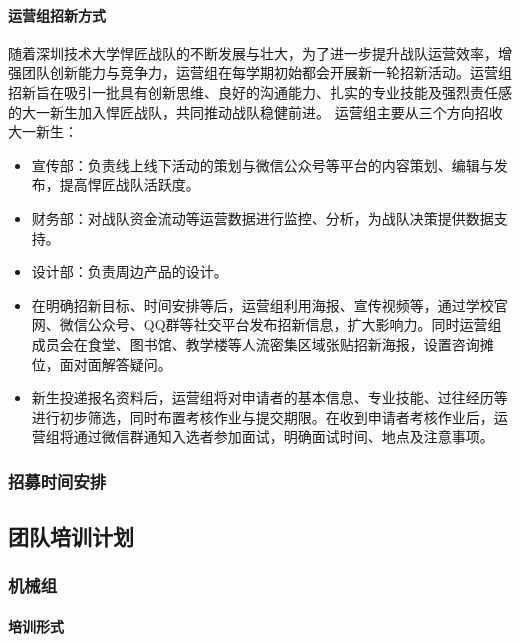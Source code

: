             \paragraph{运营组招新方式}

                随着深圳技术大学悍匠战队的不断发展与壮大，为了进一步提升战队运营效率，增强团队创新能力与竞争力，运营组在每学期初始都会开展新一轮招新活动。运营组招新旨在吸引一批具有创新思维、良好的沟通能力、扎实的专业技能及强烈责任感的大一新生加入悍匠战队，共同推动战队稳健前进。
                运营组主要从三个方向招收大一新生：


                \begin{itemize}
                    \item 宣传部：负责线上线下活动的策划与微信公众号等平台的内容策划、编辑与发布，提高悍匠战队活跃度。
                    \item 财务部：对战队资金流动等运营数据进行监控、分析，为战队决策提供数据支持。
                    \item 设计部：负责周边产品的设计。
                    \item 在明确招新目标、时间安排等后，运营组利用海报、宣传视频等，通过学校官网、微信公众号、QQ群等社交平台发布招新信息，扩大影响力。同时运营组成员会在食堂、图书馆、教学楼等人流密集区域张贴招新海报，设置咨询摊位，面对面解答疑问。
                    \item 新生投递报名资料后，运营组将对申请者的基本信息、专业技能、过往经历等进行初步筛选，同时布置考核作业与提交期限。在收到申请者考核作业后，运营组将通过微信群通知入选者参加面试，明确面试时间、地点及注意事项。
                \end{itemize}

        \subsubsection{招募时间安排}

    \subsection{团队培训计划}

        \subsubsection{机械组}

            \paragraph{培训形式}

